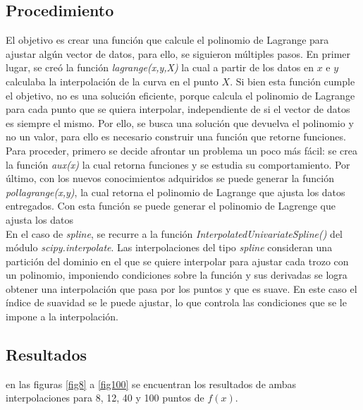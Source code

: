 \documentclass[10pt,a4paper]{article}
\begin{document}
\subsection{Procedimiento}
El objetivo es crear una función que calcule el polinomio de Lagrange para ajustar algún vector de datos, para ello, se siguieron múltiples pasos. En primer lugar, se creó la función\textit{ lagrange(x,y,X)} la cual a partir de los datos en $x$ e $y$ calculaba la interpolación de la curva en el punto $X$. Si bien esta función cumple el objetivo, no es una solución eficiente, porque calcula el polinomio de Lagrange para cada punto que se quiera interpolar, independiente de si el vector de datos es siempre el mismo. Por ello, se busca una solución que devuelva el polinomio y no un valor, para ello es necesario construir una función que retorne funciones. Para proceder, primero se decide afrontar un problema un poco más fácil: se crea la función \textit{aux(x)} la cual retorna funciones y se estudia su comportamiento. Por último, con los nuevos conocimientos adquiridos se puede generar la función \textit{pol\textunderscore lagrange(x,y)}, la cual retorna el polinomio de Lagrange que ajusta los datos entregados. Con esta función se puede generar el polinomio de Lagrenge que ajusta los datos\\

\noindent En el caso de \textit{spline}, se recurre a la función \textit{InterpolatedUnivariateSpline()} del módulo \textit{scipy.interpolate}. Las interpolaciones del tipo \textit{spline} consideran una partición del dominio en el que se quiere interpolar para ajustar cada trozo con un polinomio, imponiendo condiciones sobre la función y sus derivadas se logra obtener una interpolación que pasa por los puntos y que es suave. En este caso el índice de suavidad se le puede ajustar, lo que controla las condiciones que se le impone a la interpolación.

\subsection{Resultados}
en las figuras \ref{fig8} a \ref{fig100} se encuentran los resultados de ambas interpolaciones para 8, 12, 40 y 100 puntos de $f(x)$.\\
\end{document}

